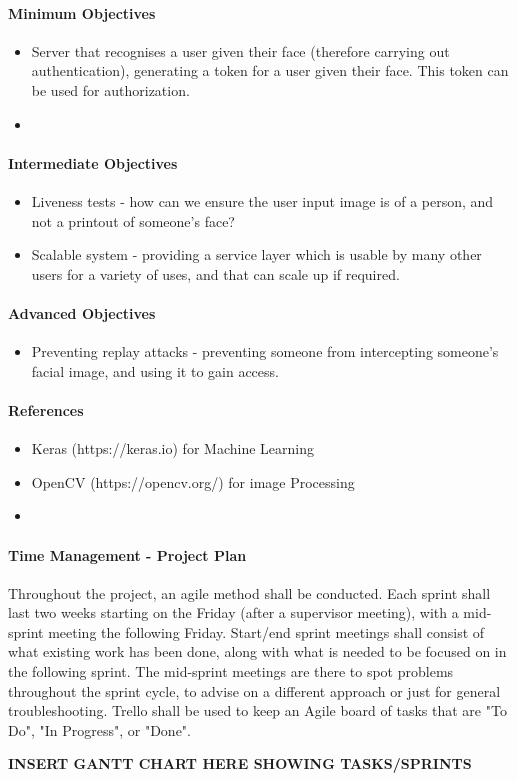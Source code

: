 \documentclass{article}
\begin{document}
    \paragraph{Minimum Objectives}
        \begin{itemize}
            \item Server that recognises a user given their face (therefore carrying out authentication), generating a token for a user given their face. This token can be used for authorization.
            \item 
        \end{itemize}
    \paragraph{Intermediate Objectives}
        \begin{itemize}
            \item Liveness tests - how can we ensure the user input image is of a person, and not a printout of someone's face?
            \item Scalable system - providing a service layer which is usable by many other users for a variety of uses, and that can scale up if required.
        \end{itemize}
    \paragraph{Advanced Objectives}
        \begin{itemize}
            \item Preventing replay attacks - preventing someone from intercepting someone's facial image, and using it to gain access.
        \end{itemize}
    \paragraph{References}
        \begin{itemize}
            \item Keras (https://keras.io) for Machine Learning
            \item OpenCV (https://opencv.org/) for image Processing
            \item 
        \end{itemize}

    \paragraph{Time Management - Project Plan}
    
    Throughout the project, an agile method shall be conducted. Each sprint shall last two weeks
    starting on the Friday (after a supervisor meeting), 
    with a mid-sprint meeting the following Friday. Start/end sprint meetings shall consist of what existing work has been done, along with what is needed to be focused on in the following sprint. The mid-sprint meetings
    are there to spot problems throughout the sprint cycle, to advise on a different approach or just for general troubleshooting. Trello shall be used to keep an Agile board of tasks that are "To Do", "In Progress",
    or "Done". 

    \textbf{INSERT GANTT CHART HERE SHOWING TASKS/SPRINTS}
    
\end{document}

